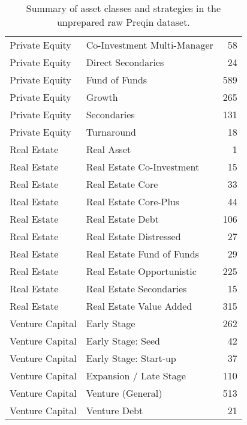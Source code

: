\begin{table}[ht]
\begin{tabular}{llr}
		Private Equity & Co-Investment Multi-Manager &   58 \\ 
		Private Equity & Direct Secondaries &   24 \\ 
		Private Equity & Fund of Funds &  589 \\ 
		Private Equity & Growth &  265 \\ 
		Private Equity & Secondaries &  131 \\ 
		Private Equity & Turnaround &   18 \\ 
		\hline
		Real Estate & Real Asset &    1 \\ 
		Real Estate & Real Estate Co-Investment &   15 \\ 
		Real Estate & Real Estate Core &   33 \\ 
		Real Estate & Real Estate Core-Plus &   44 \\ 
		Real Estate & Real Estate Debt &  106 \\ 
		Real Estate & Real Estate Distressed &   27 \\ 
		Real Estate & Real Estate Fund of Funds &   29 \\ 
		Real Estate & Real Estate Opportunistic &  225 \\ 
		Real Estate & Real Estate Secondaries &   15 \\ 
		Real Estate & Real Estate Value Added &  315 \\ 
		\hline
		Venture Capital & Early Stage &  262 \\ 
		Venture Capital & Early Stage: Seed &   42 \\ 
		Venture Capital & Early Stage: Start-up &   37 \\ 
		Venture Capital & Expansion / Late Stage &  110 \\ 
		Venture Capital & Venture (General) &  513 \\ 
		Venture Capital & Venture Debt &   21 \\ 
		\hline
	\end{tabular}
	\caption{Summary of asset classes and strategies in the unprepared raw Preqin dataset.} 
	\label{tab:summary_preqin_strategy}
\end{table}


